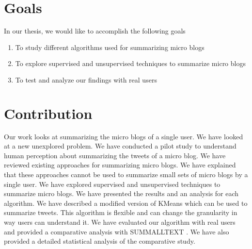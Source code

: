 \section{Goals}
In our thesis, we would like to accomplish the following goals
\begin{enumerate}
\item To study different algorithms used for summarizing micro blogs
\item To explore supervised and unsupervised techniques to summarize micro blogs
\item To test and analyze our findings with real users
\end{enumerate}

\section{Contribution}

Our work looks at summarizing the micro blogs of a single user.  We have looked at a new unexplored problem. We have conducted a pilot study to understand human perception about summarizing the tweets of a micro blog. We have reviewed existing approaches for summarizing micro blogs. We have explained that these approaches cannot be used to summarize small sets of micro blogs by a single user. We have explored supervised and unsupervised techniques to summarize micro blogs. We have presented the results and an analysis for each algorithm. We have described a modified version of KMeans which can be used to summarize tweets. This algorithm is flexible and can change the granularity in way users can understand it. We have evaluated our algorithm with real users and provided a comparative analysis with SUMMALLTEXT \cite{DBLP:conf/icwsm/ChakrabartiP11}. We have also provided a detailed statistical analysis of the comparative study.




